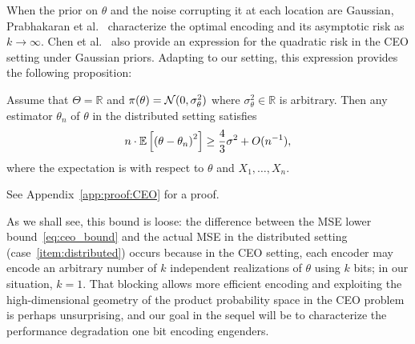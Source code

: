 When the prior on $\theta$ and the noise corrupting it at each location are
Gaussian, Prabhakaran et al.~\cite{prabhakaran2004rate} characterize the
optimal encoding and its asymptotic risk as $k \to \infty$.  Chen et
al.~\cite{chen2004upper} also provide an expression for the quadratic risk
in the CEO setting under Gaussian priors. Adapting to our setting, this
expression provides the following proposition:
\begin{prop} \label{prop:CEO}
  Assume that $\Theta = \mathbb R$ and $\pi(\theta) =
  \mathcal{N}(0,\sigma_\theta^2)$ where $\sigma_\theta^2 \in \mathbb R$ is
  arbitrary. Then any estimator ${\theta}_n$ of $\theta$ in the distributed
  setting satisfies
  \begin{equation} \label{eq:ceo_bound}
    n \cdot \mathbb{E}\left[ \left( \theta - \theta_n \right)^2\right] \geq \frac{4}{3} \sigma^2 + O(n^{-1}),
  \end{equation}
  where the expectation is with respect to $\theta$ and $X_1,\ldots,X_n$.
\end{prop}
\noindent
See Appendix~\ref{app:proof:CEO} for a proof.

As we shall see, this bound is loose: the difference between the MSE lower
bound~\eqref{eq:ceo_bound} and the actual MSE in the distributed setting
(case~\eqref{item:distributed}) occurs because in the CEO setting, each
encoder may encode an arbitrary number of $k$ independent realizations of
$\theta$ using $k$ bits; in our situation, $k = 1$. That blocking allows
more efficient encoding and exploiting the high-dimensional geometry of the
product probability space in the CEO problem is perhaps unsurprising, and
our goal in the sequel will be to characterize the performance degradation
one bit encoding engenders.
